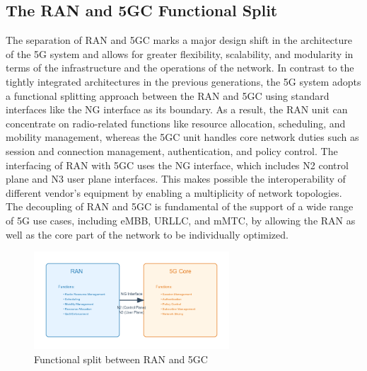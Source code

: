 \documentclass{report}
\begin{document}
\subsection{The RAN and 5GC Functional Split}
The separation of RAN and 5GC marks a major design shift in the architecture of the 5G system and allows for greater flexibility, scalability, and modularity in terms of the infrastructure and the operations of the network. In contrast to the tightly integrated architectures in the previous generations, the 5G system adopts a functional splitting approach between the RAN and 5GC using standard interfaces like the NG interface as its boundary. As a result, the RAN unit can concentrate on radio-related functions like resource allocation, scheduling, and mobility management, whereas the 5GC unit handles core network duties such as session and connection management, authentication, and policy control. The interfacing of RAN with 5GC uses the NG interface, which includes N2 control plane and N3 user plane interfaces. This makes possible the interoperability of different vendor’s equipment by enabling a multiplicity of network topologies. The decoupling of RAN and 5GC is fundamental of the support of a wide range of 5G use cases, including eMBB, URLLC, and mMTC, by allowing the RAN as well as the core part of the network to be individually optimized.

\begin{figure}[h]
    \centering
    \includegraphics[width=0.65\textwidth]{figures/ran5g.png}
    \caption{Functional split between RAN and 5GC}
    \label{fig:ran5gc}
\end{figure}
\end{document}
